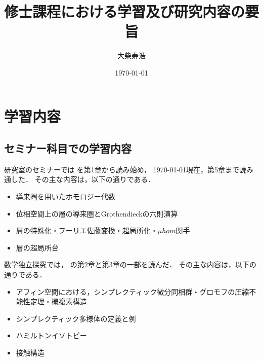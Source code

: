\newcommand{\cotn}[1][]{\dot{T}^{\ast}{#1}}


\newcommand{\muhom}{\mu hom}
\newcommand{\muHom}[1][]{\mathrm{Hom}^\mu_{\raise1.5ex\hbox to.1em{}#1}}

\newcommand{\mucat}[2][]{\mathsf{D}^{\mathrm{b}}_{#1}(#2)}

\newcommand{\conv}[1][]{\mathbin{\mathop{\circ}\limits_{#1}}}

\newcommand{\torus}{\mathbf{T}}

\newcommand{\const}{\mathrm{const.}}
\newcommand{\norm}[1][]{\left\lVert{#1}\right\rVert}
\newcommand{\abs}[1][]{\left\lvert{#1}\right\rvert}




\title{修士課程における学習及び研究内容の要旨}
\author{大柴寿浩}
\date{\today}

\maketitle

\section{学習内容}

\subsection{セミナー科目での学習内容}

研究室のセミナーでは
\cite{KS90}を第1章から読み始め，
\today 現在，第5章まで読み通した．
その主な内容は，以下の通りである．
\begin{itemize}
    \item 導来圏を用いたホモロジー代数
    \item 位相空間上の層の導来圏とGrothendieckの六則演算
    \item 層の特殊化・フーリエ佐藤変換・超局所化・\(\muhom\)関手
    \item 層の超局所台
\end{itemize}

数学独立探究では，
\cite{MS17}の第2章と第3章の一部を読んだ．
その主な内容は，以下の通りである．
\begin{itemize}
    \item アフィン空間における，シンプレクティック微分同相群・グロモフの圧縮不能性定理・概複素構造
    \item シンプレクティック多様体の定義と例
    \item ハミルトンイソトピー
    \item 接触構造
\end{itemize}

